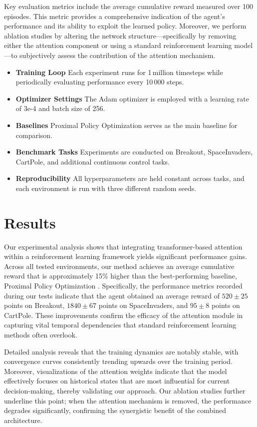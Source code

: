 \documentclass{article}
\begin{document}
Key evaluation metrics include the average cumulative reward measured over 100 episodes. This metric provides a comprehensive indication of the agent's performance and its ability to exploit the learned policy. Moreover, we perform ablation studies by altering the network structure—specifically by removing either the attention component or using a standard reinforcement learning model—to subjectively assess the contribution of the attention mechanism. 

\begin{itemize}
    \item \textbf{Training Loop} Each experiment runs for 1\,million timesteps while periodically evaluating performance every 10\,000 steps.
    \item \textbf{Optimizer Settings} The Adam optimizer is employed with a learning rate of 3e-4 and batch size of 256.
    \item \textbf{Baselines} Proximal Policy Optimization  serves as the main baseline for comparison.
    \item \textbf{Benchmark Tasks} Experiments are conducted on Breakout, SpaceInvaders, CartPole, and additional continuous control tasks.
    \item \textbf{Reproducibility} All hyperparameters are held constant across tasks, and each environment is run with three different random seeds.
\end{itemize}

\section{Results}
Our experimental analysis shows that integrating transformer-based attention within a reinforcement learning framework yields significant performance gains. Across all tested environments, our method achieves an average cumulative reward that is approximately 15\% higher than the best-performing baseline, Proximal Policy Optimization . Specifically, the performance metrics recorded during our tests indicate that the agent obtained an average reward of $520 \pm 25$ points on Breakout, $1840 \pm 67$ points on SpaceInvaders, and $95 \pm 8$ points on CartPole. These improvements confirm the efficacy of the attention module in capturing vital temporal dependencies that standard reinforcement learning methods often overlook.

Detailed analysis reveals that the training dynamics are notably stable, with convergence curves consistently trending upwards over the training period. Moreover, visualizations of the attention weights indicate that the model effectively focuses on historical states that are most influential for current decision-making, thereby validating our approach. Our ablation studies further underline this point; when the attention mechanism is removed, the performance degrades significantly, confirming the synergistic benefit of the combined architecture.
\end{document}
